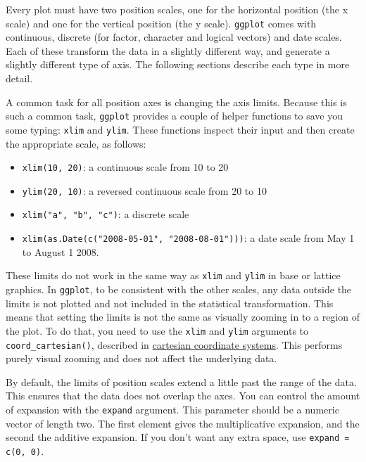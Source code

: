 
Every plot must have two position scales, one for the horizontal
position (the x scale) and one for the vertical position (the y scale).
\texttt{ggplot} comes with continuous, discrete (for factor, character
and logical vectors) and date scales. Each of these transform the data
in a slightly different way, and generate a slightly different type of
axis. The following sections describe each type in more detail.
 

A common task for all position axes is changing the axis limits. Because
this is such a common task, \texttt{ggplot} provides a couple of helper
functions to save you some typing: \texttt{xlim} and \texttt{ylim}.
These functions inspect their input and then create the appropriate
scale, as follows:  
  

\begin{itemize}
\itemsep1pt\parskip0pt
\item
  \texttt{xlim(10, 20)}: a continuous scale from 10 to 20
\item
  \texttt{ylim(20, 10)}: a reversed continuous scale from 20 to 10
\item
  \texttt{xlim("a", "b", "c")}: a discrete scale
\item
  \texttt{xlim(as.Date(c("2008-05-01", "2008-08-01")))}: a date scale
  from May 1 to August 1 2008.
\end{itemize}

These limits do not work in the same way as \texttt{xlim} and
\texttt{ylim} in base or lattice graphics. In \texttt{ggplot}, to be
consistent with the other scales, any data outside the limits is not
plotted and not included in the statistical transformation. This means
that setting the limits is not the same as visually zooming in to a
region of the plot. To do that, you need to use the \texttt{xlim} and
\texttt{ylim} arguments to \texttt{coord\_cartesian()}, described in
\hyperref[sub:cartesian]{cartesian coordinate systems}. This performs
purely visual zooming and does not affect the underlying data.

By default, the limits of position scales extend a little past the range
of the data. This ensures that the data does not overlap the axes. You
can control the amount of expansion with the \texttt{expand} argument.
This parameter should be a numeric vector of length two. The first
element gives the multiplicative expansion, and the second the additive
expansion. If you don't want any extra space, use
\texttt{expand = c(0, 0)}. 

